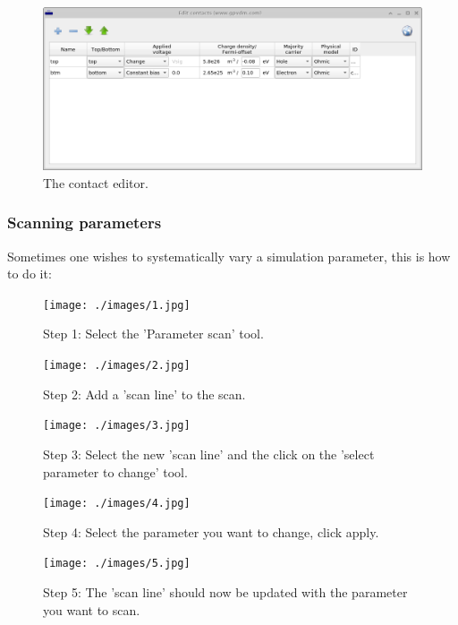 \begin{figure}[ht!]
\centering
\includegraphics[width=\textwidth]{./images/contact_editor.png}
{\caption{The contact editor.}}
\label{fig:contact_editor}
\end{figure}



\subsubsection{Scanning parameters}
Sometimes one wishes to systematically vary a simulation parameter, this is how to do it:




\begin{figure}[ht!]
\centering
\texttt{[image: ./images/1.jpg]}
{\caption*{Step 1: Select the 'Parameter scan' tool.}}
\label{overflow}
\end{figure}


\begin{figure}[ht!]
\centering
\texttt{[image: ./images/2.jpg]}
\caption*{Step 2: Add a 'scan line' to the scan.}
\end{figure}

\begin{figure}[ht!]
\centering
\texttt{[image: ./images/3.jpg]}
\caption*{Step 3: Select the new 'scan line' and the click on the 'select parameter to change' tool.}
\label{overflow}
\end{figure}


\begin{figure}[ht!]
\centering
\texttt{[image: ./images/4.jpg]}
\caption*{Step 4: Select the parameter you want to change, click apply.}
\end{figure}


\begin{figure}[ht!]
\centering
\texttt{[image: ./images/5.jpg]}
\caption*{Step 5: The 'scan line' should now be updated with the parameter you want to scan.}
\end{figure}


